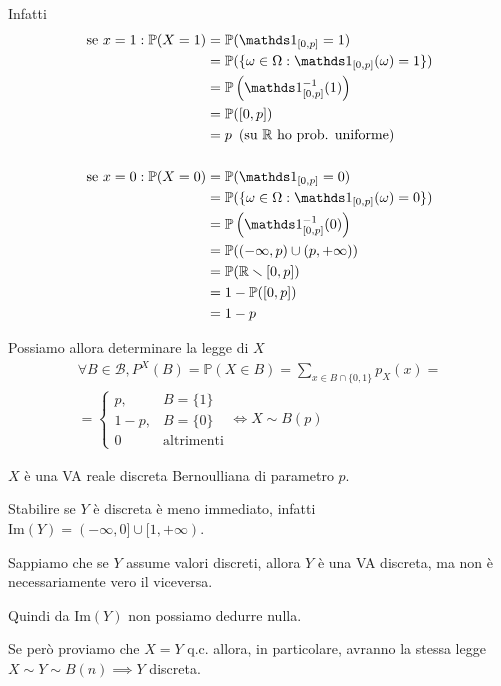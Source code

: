 \begin{enumerate}
Infatti\begin{equation*}
\begin{aligned}
\text{se} \ x=1:\mathbb{P}( X=1) & =\mathbb{P}(\Ind_{[ 0,p]} =1)\\
 & =\mathbb{P}(\{\omega \in \Omega :\Ind_{[ 0,p]}( \omega ) =1\})\\
 & =\mathbb{P}\left(\Ind_{[ 0,p]}^{-1}( 1)\right)\\
 & =\mathbb{P}([ 0,p])\\
 & =p\ \left(\text{su} \ \mathbb{R} \ \text{ho prob. uniforme}\right)\\
 & \\
\text{se} \ x=0:\mathbb{P}( X=0) & =\mathbb{P}(\Ind_{[ 0,p]} =0)\\
 & =\mathbb{P}(\{\omega \in \Omega :\Ind_{[ 0,p]}( \omega ) =0\})\\
 & =\mathbb{P}\left(\Ind_{[ 0,p]}^{-1}( 0)\right)\\
 & =\mathbb{P}(( -\infty ,p) \cup ( p,+\infty ))\\
 & =\mathbb{P}(\mathbb{R} \smallsetminus [ 0,p])\\
 & =1-\mathbb{P}([ 0,p])\\
 & =1-p
\end{aligned}
\end{equation*}

Possiamo allora determinare la legge di $X$\begin{gather*}
\forall B\in \mathcal{B} ,P^{X}( B) =\mathbb{P}( X\in B) =\sum\limits _{x\in B\cap \{0,1\}} p_{X}( x) =\\
=\begin{cases}
p, & B=\{1\}\\
1-p, & B=\{0\}\\
0 & \text{altrimenti}
\end{cases} \iff \boxed{X\sim B( p)}
\end{gather*}

$X$ è una VA reale discreta Bernoulliana di parametro $p$.

Stabilire se $Y$ è discreta è meno immediato, infatti $\mathrm{Im}( Y) =( -\infty ,0] \cup [ 1,+\infty )$.

\begin{oss}
Sappiamo che se $Y$ assume valori discreti, allora $Y$ è una VA discreta, ma non è necessariamente vero il viceversa.
\end{oss}

Quindi da $\mathrm{Im}( Y)$ non possiamo dedurre nulla.

Se però proviamo che $X=Y$ q.c. allora, in particolare, avranno la stessa legge $X\sim Y\sim B( n) \implies Y$ discreta.


\end{enumerate}
